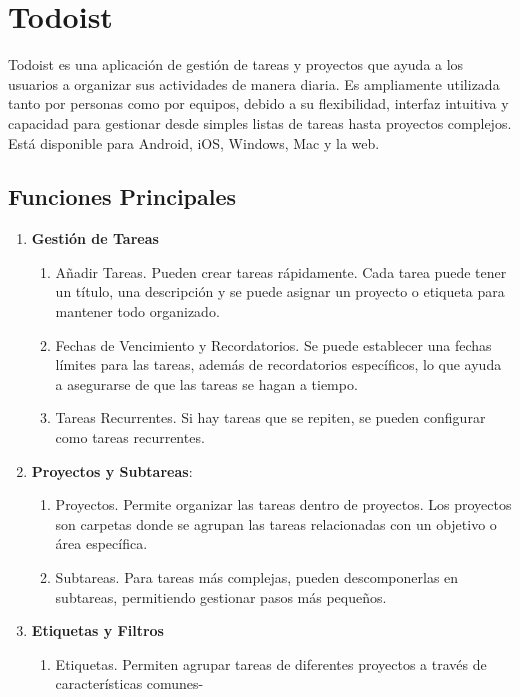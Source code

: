 \documentclass{article}
\begin{document}
\section{Todoist}
Todoist es una aplicación de gestión de tareas y proyectos que ayuda a los usuarios a organizar sus actividades de manera diaria. 
Es ampliamente utilizada tanto por personas como por equipos, debido a su flexibilidad, interfaz intuitiva y capacidad para gestionar
desde simples listas de tareas hasta proyectos complejos. Está disponible para Android, iOS, Windows, Mac y la web.

\subsection{Funciones Principales}

\begin{enumerate}
    \item \textbf{Gestión de Tareas}
    \begin{enumerate}
        \item Añadir Tareas. Pueden crear tareas rápidamente. Cada tarea puede tener un título, una descripción y se puede asignar un proyecto o etiqueta para mantener todo organizado.
        \item Fechas de Vencimiento y Recordatorios. Se puede establecer una fechas límites para las tareas, además de recordatorios específicos, lo que ayuda a asegurarse de que las tareas se hagan a tiempo.
        \item Tareas Recurrentes. Si hay tareas que se repiten, se pueden configurar como tareas recurrentes. 
    \end{enumerate}
    \item \textbf{Proyectos y Subtareas}: 
    \begin{enumerate}
        \item Proyectos. Permite organizar las tareas dentro de proyectos. Los proyectos son carpetas donde se agrupan las tareas relacionadas con un objetivo o área específica.
        \item Subtareas. Para tareas más complejas, pueden descomponerlas en subtareas, permitiendo gestionar pasos más pequeños. 
    \end{enumerate}
    \item \textbf{Etiquetas y Filtros}
    \begin{enumerate}
        \item Etiquetas. Permiten agrupar tareas de diferentes proyectos a través de características comunes-

\end{enumerate}
\end{enumerate}
\end{document}

